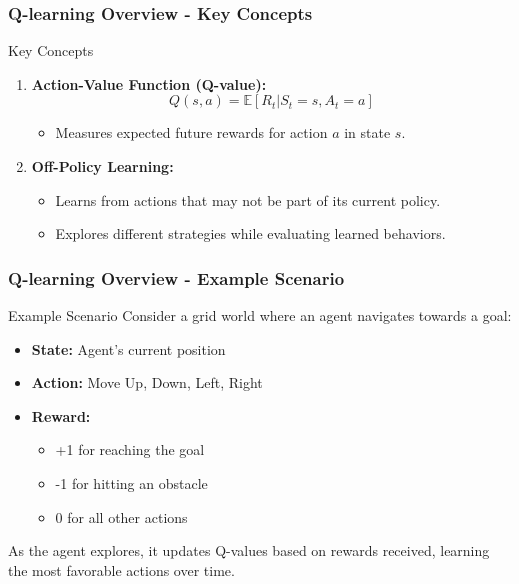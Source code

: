 \documentclass[aspectratio=169]{beamer}
\begin{document}
\begin{frame}[fragile]
    \frametitle{Q-learning Overview - Key Concepts}
    \begin{block}{Key Concepts}
        \begin{enumerate}
            \item \textbf{Action-Value Function (Q-value):}
                \[
                Q(s, a) = \mathbb{E}[R_t | S_t = s, A_t = a]
                \]
                \begin{itemize}
                    \item Measures expected future rewards for action \( a \) in state \( s \).
                \end{itemize}

            \item \textbf{Off-Policy Learning:}
                \begin{itemize}
                    \item Learns from actions that may not be part of its current policy.
                    \item Explores different strategies while evaluating learned behaviors.
                \end{itemize}
        \end{enumerate}
    \end{block}
\end{frame}

\begin{frame}[fragile]
    \frametitle{Q-learning Overview - Example Scenario}
    \begin{block}{Example Scenario}
        Consider a grid world where an agent navigates towards a goal:
        \begin{itemize}
            \item \textbf{State:} Agent's current position
            \item \textbf{Action:} Move Up, Down, Left, Right
            \item \textbf{Reward:} 
                \begin{itemize}
                    \item +1 for reaching the goal
                    \item -1 for hitting an obstacle
                    \item 0 for all other actions
                \end{itemize}
        \end{itemize}
        As the agent explores, it updates Q-values based on rewards received, learning the most favorable actions over time.
    \end{block}
\end{frame}
\end{document}
